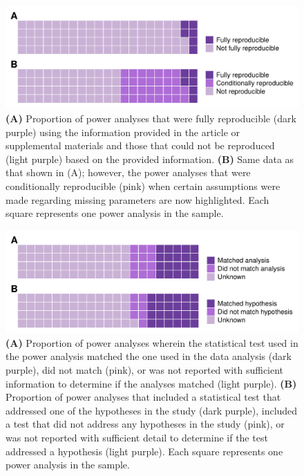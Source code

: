 \documentclass[
  man, donotrepeattitle,mask,floatsintext]{apa7}
\begin{document}
\clearpage

\begin{figure}

{\centering \includegraphics{../../figs/fig1} 

}

\caption{\normalfont
\textbf{(A)} Proportion of power analyses that were fully reproducible (dark purple) using the information provided in the article or supplemental materials and those that could not be reproduced (light purple) based on the provided information. \textbf{(B)} Same data as that shown in (A); however, the power analyses that were conditionally reproducible (pink) when certain assumptions were made regarding missing parameters are now highlighted. Each square represents one power analysis in the sample.}\label{fig:fig1}
\end{figure}




\clearpage

\begin{figure}

{\centering \includegraphics{../../figs/fig2} 

}

\caption{\normalfont
\textbf{(A)} Proportion of power analyses wherein the statistical test used in the power analysis matched the one used in the data analysis (dark purple), did not match (pink), or was not reported with sufficient information to determine if the analyses matched (light purple). \textbf{(B)} Proportion of power analyses that included a statistical test that addressed one of the hypotheses in the study (dark purple), included a test that did not address any hypotheses in the study (pink), or was not reported with sufficient detail to determine if the test addressed a hypothesis (light purple). Each square represents one power analysis in the sample.}\label{fig:fig2}
\end{figure}
\end{document}
